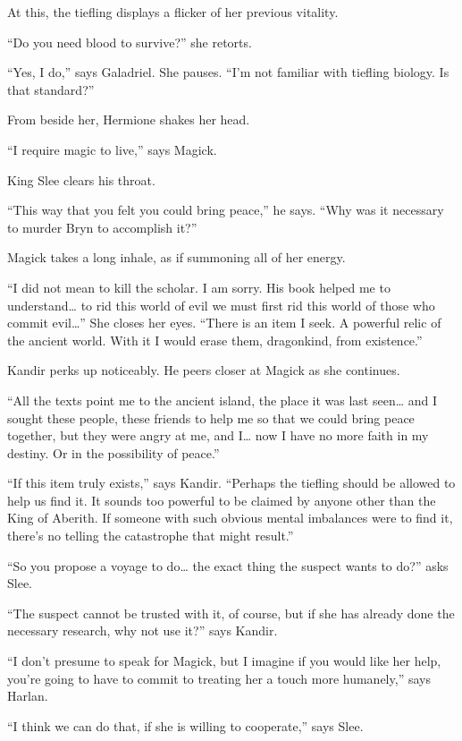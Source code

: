 \documentclass[smalldemyvopaper,11pt,twoside,onecolumn,openright,extrafontsizes]{memoir}
\begin{document}
At this, the tiefling displays a flicker of her previous vitality.

``Do you need blood to survive?'' she retorts.

``Yes, I do,'' says Galadriel. She pauses. ``I'm not familiar with
tiefling biology. Is that standard?''

From beside her, Hermione shakes her head.

``I require magic to live,'' says Magick.

King Slee clears his throat.

``This way that you felt you could bring peace,'' he says. ``Why was it
necessary to murder Bryn to accomplish it?''

Magick takes a long inhale, as if summoning all of her energy.

``I did not mean to kill the scholar. I am sorry. His book helped me to
understand\ldots{} to rid this world of evil we must first rid this
world of those who commit evil\ldots{}'' She closes her eyes. ``There is
an item I seek. A powerful relic of the ancient world. With it I would
erase them, dragonkind, from existence.''

Kandir perks up noticeably. He peers closer at Magick as she continues.

``All the texts point me to the ancient island, the place it was last
seen\ldots{} and I sought these people, these friends to help me so that
we could bring peace together, but they were angry at me, and I\ldots{}
now I have no more faith in my destiny. Or in the possibility of
peace.''

``If this item truly exists,'' says Kandir. ``Perhaps the tiefling
should be allowed to help us find it. It sounds too powerful to be
claimed by anyone other than the King of Aberith. If someone with such
obvious mental imbalances were to find it, there's no telling the
catastrophe that might result.''

``So you propose a voyage to do\ldots{} the exact thing the suspect
wants to do?'' asks Slee.

``The suspect cannot be trusted with it, of course, but if she has
already done the necessary research, why not use it?'' says Kandir.

``I don't presume to speak for Magick, but I imagine if you would like
her help, you're going to have to commit to treating her a touch more
humanely,'' says Harlan.

``I think we can do that, if she is willing to cooperate,'' says Slee.
\end{document}
